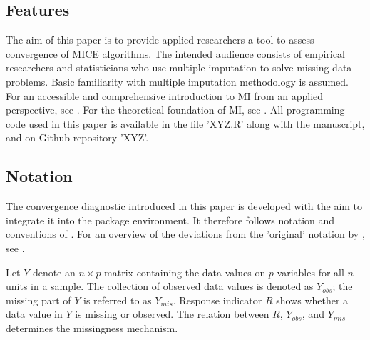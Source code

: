 \documentclass[article]{jss}
\begin{document}
\subsection{Features} \label{sec:features}

The aim of this paper is to provide applied researchers a tool to assess convergence of MICE algorithms. The intended audience consists of empirical researchers and statisticians who use multiple imputation to solve missing data problems. Basic familiarity with multiple imputation methodology is assumed. For an accessible and comprehensive introduction to MI from an applied perspective, see \cite{buur18}. For the theoretical foundation of MI, see \cite{rubin87}. All programming code used in this paper is available in the file 'XYZ.R' along with the manuscript, and on Github repository 'XYZ'. 



\subsection{Notation} \label{sec:notation}

The convergence diagnostic introduced in this paper is developed with the aim to integrate it into the  package  environment. It therefore follows notation and conventions of \cite{mice}. For an overview of the deviations from the 'original' notation by \cite{rubin87}, see \cite{buur18}. 

Let $Y$ denote an $n \times p$ matrix containing the data values on $p$ variables for all $n$ units in a sample. The collection of observed data values is denoted as $Y_{obs}$; the missing part of $Y$ is referred to as $Y_{mis}$. Response indicator $R$ shows whether a data value in $Y$ is missing or observed. The relation between $R$, $Y_{obs}$, and $Y_{mis}$ determines the missingness mechanism.
\end{document}
